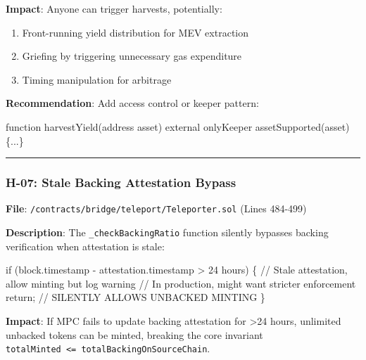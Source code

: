 \documentclass[
]{article}
\newenvironment{Shaded}{}{}
\newcommand{\NormalTok}[1]{#1}
\providecommand{\tightlist}{%
  \setlength{\itemsep}{0pt}\setlength{\parskip}{0pt}}
\begin{document}
\textbf{Impact}: Anyone can trigger harvests, potentially:

\begin{enumerate}
\def\labelenumi{\arabic{enumi}.}
\tightlist
\item
  Front-running yield distribution for MEV extraction
\item
  Griefing by triggering unnecessary gas expenditure
\item
  Timing manipulation for arbitrage
\end{enumerate}

\textbf{Recommendation}: Add access control or keeper pattern:

\begin{Shaded}
\begin{Highlighting}[]
\NormalTok{function harvestYield(address asset) external onlyKeeper assetSupported(asset) \{...\}}
\end{Highlighting}
\end{Shaded}

\begin{center}\rule{0.5\linewidth}{0.5pt}\end{center}

\subsubsection{H-07: Stale Backing Attestation
Bypass}\label{h-07-stale-backing-attestation-bypass}

\textbf{File}: \texttt{/contracts/bridge/teleport/Teleporter.sol} (Lines
484-499)

\textbf{Description}: The \texttt{\_checkBackingRatio} function silently
bypasses backing verification when attestation is stale:

\begin{Shaded}
\begin{Highlighting}[]
\NormalTok{if (block.timestamp {-} attestation.timestamp \textgreater{} 24 hours) \{}
\NormalTok{    // Stale attestation, allow minting but log warning}
\NormalTok{    // In production, might want stricter enforcement}
\NormalTok{    return;  // SILENTLY ALLOWS UNBACKED MINTING}
\NormalTok{\}}
\end{Highlighting}
\end{Shaded}

\textbf{Impact}: If MPC fails to update backing attestation for
\textgreater24 hours, unlimited unbacked tokens can be minted, breaking
the core invariant
\texttt{totalMinted\ \textless{}=\ totalBackingOnSourceChain}.
\end{document}
